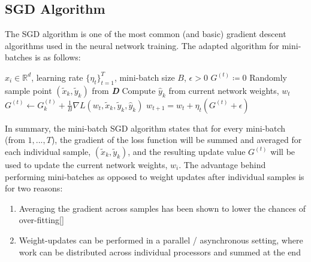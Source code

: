 \subsection*{SGD Algorithm}

The SGD algorithm is one of the most common (and basic) gradient descent algorithms used in the neural network training. The adapted algorithm for mini-batches is as follows:
\vspace{14pt}
\begin{minipage}[b]{.48\textwidth}
\begin{algorithm}[H]\small
	\caption{$Mini-batch\:SGD$}
	\label{alg:SGD}
	\begin{algorithmic}
		 $x_i \in \mathbb{R}^d$, learning rate $\{\eta_t\}_{t=1}^T$, mini-batch size $B$, $\epsilon>0$
		\vspace{2pt}
		\vspace{2pt}
		\STATE $G^{(t)}\coloneqq 0$
		\vspace{2pt}
		    \vspace{2pt}
		    \STATE Randomly sample point $(\tilde x_k,\tilde y_k)$ from \textbf{\textit{D}}
		    \vspace{2pt}
		    \STATE Compute $\hat y_k$ from current network weights, $w_t$
		    \vspace{2pt}
		    \STATE $G^{(t)}\leftarrow G_k^{(t)} + \frac{1}{B}\nabla L(w_t,\tilde x_{k},\tilde y_k,\hat y_k)$
		    \vspace{4pt}
		\ENDFOR
		\vspace{2pt}
		\STATE $w_{t+1} = w_{t} + \eta_t (G^{(t)} + \epsilon)$
		\vspace{4pt}
		\ENDFOR
	\end{algorithmic}
\end{algorithm}
\end{minipage}\hfill
\vspace{-8pt}

In summary, the mini-batch SGD algorithm states that for every mini-batch (from $1,...,\textit{T}$), the gradient of the loss function will be summed and averaged for each individual sample, $(\tilde x_k,\tilde y_k)$, and the resulting update value $G^{(t)}$ will be used to update the current network weights, $w_i$. The advantage behind performing mini-batches as opposed to weight updates after individual samples is for two reasons:
\vspace{4pt}
\begin{enumerate}
    \item Averaging the gradient across samples has been shown to lower the chances of over-fitting[]
    \item Weight-updates can be performed in a parallel / asynchronous setting, where work can be distributed across individual processors and summed at the end
\end{enumerate}
\vspace{3pt}


